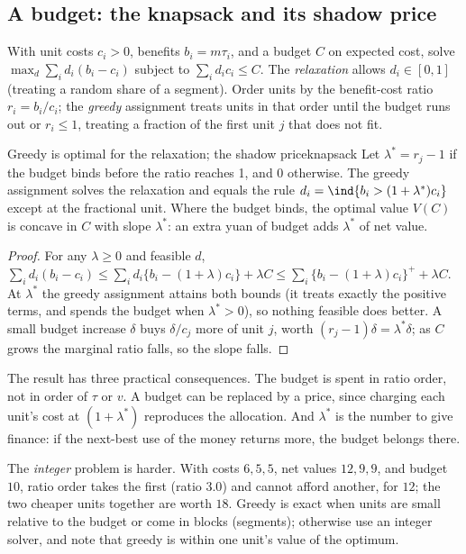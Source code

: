 \documentclass[11pt]{article}
\begin{document}
\subsection{A budget: the knapsack and its shadow price}

With unit costs $c_i > 0$, benefits $b_i = m\tau_i$, and a budget $C$ on expected cost, solve
$\max_d \sum_i d_i(b_i - c_i)$ subject to $\sum_i d_ic_i \le C$. The \emph{relaxation} allows $d_i \in [0,1]$ (treating a random
share of a segment). Order units by the benefit-cost ratio $r_i = b_i/c_i$; the \emph{greedy} assignment treats units in
that order until the budget runs out or $r_i \le 1$, treating a fraction of the first unit $j$ that does not fit.

\begin{prop}{Greedy is optimal for the relaxation; the shadow price}{knapsack}
Let $\lambda^\ast = r_j - 1$ if the budget binds before the ratio reaches 1, and $0$ otherwise. The greedy assignment solves
the relaxation and equals the rule $d_i = \ind{b_i > (1 + \lambda^\ast)c_i}$ except at the fractional unit. Where the budget
binds, the optimal value $V(C)$ is concave in $C$ with slope $\lambda^\ast$: an extra yuan of budget adds $\lambda^\ast$ of net
value.
\end{prop}
\begin{proof}
For any $\lambda \ge 0$ and feasible $d$,
$\sum_i d_i(b_i - c_i) \le \sum_i d_i\{b_i - (1+\lambda)c_i\} + \lambda C \le \sum_i\{b_i - (1+\lambda)c_i\}^+ + \lambda C$. At
$\lambda^\ast$ the greedy assignment attains both bounds (it treats exactly the positive terms, and spends the budget when
$\lambda^\ast > 0$), so nothing feasible does better. A small budget increase $\delta$ buys $\delta/c_j$ more of unit $j$, worth
$(r_j - 1)\delta = \lambda^\ast\delta$; as $C$ grows the marginal ratio falls, so the slope falls.
\end{proof}

The result has three practical consequences. The budget is spent in ratio order, not in order of $\tau$ or $v$. A
budget can be replaced by a price, since charging each unit's cost at $(1 + \lambda^\ast)$ reproduces the allocation. And
$\lambda^\ast$ is the number to give finance: if the next-best use of the money returns more, the budget belongs there.

The \emph{integer} problem is harder. With costs $6, 5, 5$, net values $12, 9, 9$, and budget $10$, ratio order takes the first (ratio $3.0$) and cannot afford
another, for $12$; the two cheaper units together are worth $18$. Greedy is exact when units are small relative to the
budget or come in blocks (segments); otherwise use an integer solver, and note that greedy is within one unit's value of
the optimum.
\end{document}
